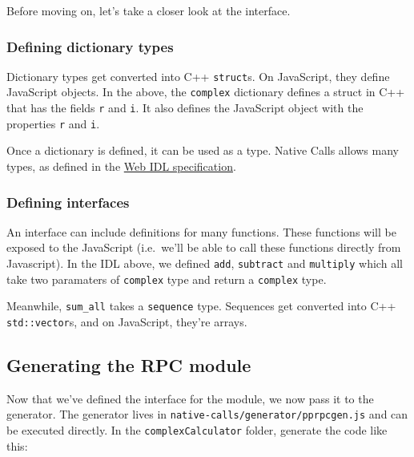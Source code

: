 Before moving on, let's take a closer look at the interface.

\subsubsection{Defining dictionary
types}\label{defining-dictionary-types}

Dictionary types get converted into C++ \texttt{struct}s. On JavaScript,
they define JavaScript objects. In the above, the \texttt{complex}
dictionary defines a struct in C++ that has the fields \texttt{r} and
\texttt{i}. It also defines the JavaScript object with the properties
\texttt{r} and \texttt{i}.

Once a dictionary is defined, it can be used as a type. Native Calls
allows many types, as defined in the
\href{http://www.w3.org/TR/WebIDL/}{Web IDL specification}.

\subsubsection{Defining interfaces}\label{defining-interfaces}

An interface can include definitions for many functions. These functions
will be exposed to the JavaScript (i.e.~we'll be able to call these
functions directly from Javascript). In the IDL above, we defined
\texttt{add}, \texttt{subtract} and \texttt{multiply} which all take two
paramaters of \texttt{complex} type and return a \texttt{complex} type.

Meanwhile, \texttt{sum\_all} takes a \texttt{sequence} type. Sequences
get converted into C++ \texttt{std::vector}s, and on JavaScript, they're
arrays.

\subsection{Generating the RPC module}\label{generating-the-rpc-module}

Now that we've defined the interface for the module, we now pass it to
the generator. The generator lives in
\texttt{native-calls/generator/pprpcgen.js} and can be executed
directly. In the \texttt{complexCalculator} folder, generate the code
like this:

\begin{Shaded}
\begin{Highlighting}[]
 
\end{Highlighting}
\end{Shaded}

